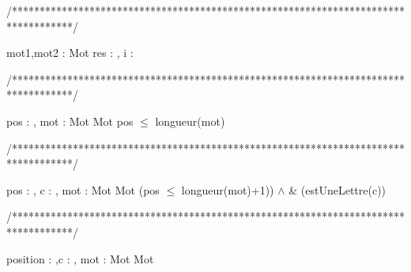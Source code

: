 /***********************************************************************************/
\begin{algorithme}
     {mot1,mot2 : Mot}%
     {\booleen}%
     {res : \booleen, i : \entier }%
     {
                  {
                  }%
                  {
                    {
                       {
                       }
                       
                       
                    }
                   }%
      
      }
\end{algorithme}

/***********************************************************************************/
\begin{algorithme}
       {pos : \entier, mot : Mot}
       {Mot}
       {pos $\leq$ longueur(mot)}
       {}
       {
             {
             }
            
        }
\end{algorithme}

/***********************************************************************************/
\begin{algorithme}
       {pos : \entier, c : \caractere, mot : Mot}%
       {Mot}%
       {(pos $\leq$ longueur(mot)+1)) $\land$ \& (estUneLettre(c))}%
       {}
       {
                {
                }
       }
\end{algorithme}

/***********************************************************************************/
\begin{algorithme}%
       {position : \entier,c : \caractere, mot : Mot}%
       {Mot}%
       {}
       {
       
       }
\end{algorithme}

